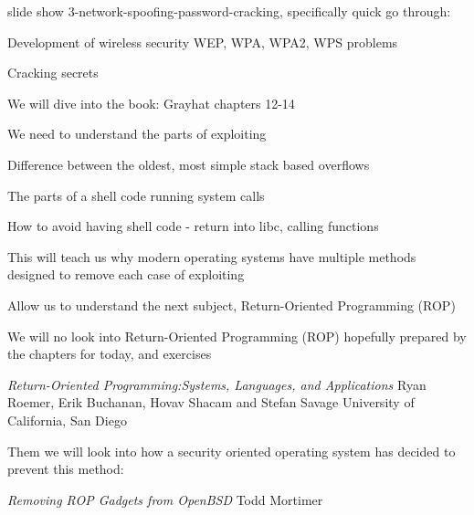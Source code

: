 \documentclass[Screen16to9,17pt]{foils}
\begin{document}

\begin{list1}
\item slide show 3-network-spoofing-password-cracking, specifically quick go through:
\item Development of wireless security WEP, WPA, WPA2, WPS problems
\item Cracking secrets
\end{list1}




\begin{list1}
\item We will dive into the book: Grayhat chapters 12-14
\item We need to understand the parts of exploiting
\item Difference between the oldest, most simple stack based overflows
\item The parts of a shell code running system calls
\item How to avoid having shell code - return into libc, calling functions
\item This will teach us why modern operating systems have multiple methods designed to remove each case of exploiting
\item Allow us to understand the next subject, Return-Oriented Programming (ROP)
\end{list1}



\begin{list1}
\item We will no look into Return-Oriented Programming (ROP) hopefully prepared by the chapters for today, and exercises
\item \emph{Return-Oriented Programming:Systems, Languages, and Applications}
Ryan Roemer, Erik Buchanan, Hovav Shacam and Stefan Savage University of California, San Diego\\
\item Them we will look into how a security oriented operating system has decided to prevent this method:
\item \emph{Removing ROP Gadgets from OpenBSD}
Todd Mortimer\\
\end{list1}
\end{document}
